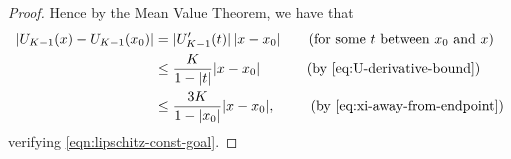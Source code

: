 \documentclass[10pt,a4paper]{amsart}
\theoremstyle{plain}
\theoremstyle{definition}
\numberwithin{equation}{section}
\numberwithin{figure}{section}
\numberwithin{table}{section}
\begin{document}
\begin{proof}
Hence by the Mean Value Theorem, we have that
\begin{align}
    |U_{K-1}(x)-U_{K-1}(x_0)|
    &=
    |U_{K-1}'(t)|\,|x-x_0| 
    \qquad \text{(for some $t$ between $x_0$ and $x$)} 
    \\
    &\le
    \frac{K}{1-|t|}|x-x_0| 
    \qquad\quad\ \text{(by \eqref{eq:U-derivative-bound})}
    \\
    &\le
    \frac{3K}{1-|x_0|}|x-x_0|, 
    \qquad\ \,  \text{(by \eqref{eq:xi-away-from-endpoint})}
\end{align}
verifying \eqref{eqn:lipschitz-const-goal}.
\end{proof}
\end{document}
